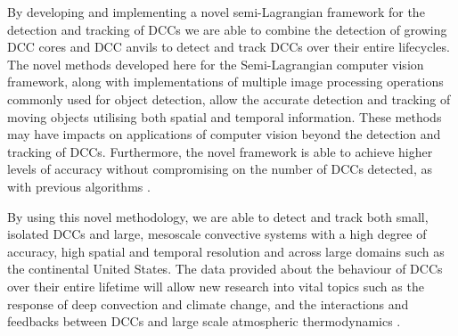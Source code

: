 \documentclass[amt, manuscript]{copernicus}
\begin{document}
By developing and implementing a novel semi-Lagrangian framework for the detection and tracking of DCCs we are able to combine the detection of growing DCC cores \citep{zinner_cb-tram:_2008} and DCC anvils \citep{muller_role_2018} to detect and track DCCs over their entire lifecycles.
The novel methods developed here for the Semi-Lagrangian computer vision framework, along with implementations of multiple image processing operations commonly used for object detection, allow the accurate detection and tracking of moving objects utilising both spatial and temporal information.
These methods may have impacts on applications of computer vision beyond the detection and tracking of DCCs.
Furthermore, the novel framework is able to achieve higher levels of accuracy without compromising on the number of DCCs detected, as with previous algorithms \citep{muller_novel_2019}.

By using this novel methodology, we are able to detect and track both small, isolated DCCs and large, mesoscale convective systems with a high degree of accuracy, high spatial and temporal resolution and across large domains such as the continental United States.
The data provided about the behaviour of DCCs over their entire lifetime will allow new research into vital topics such as the response of deep convection and climate change, and the interactions and feedbacks between DCCs and large scale atmospheric thermodynamics \citep{varble_erroneous_2018}.



\end{document}
